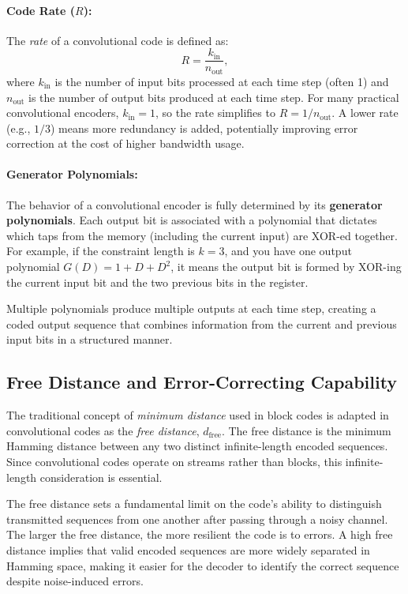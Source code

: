 \documentclass[12pt,a4paper]{article}
\begin{document}
\paragraph{Code Rate ($R$):}  
The \emph{rate} of a convolutional code is defined as:
\[
R = \frac{k_{\text{in}}}{n_{\text{out}}},
\]
where $k_{\text{in}}$ is the number of input bits processed at each time step (often 1) and $n_{\text{out}}$ is the number of output bits produced at each time step. For many practical convolutional encoders, $k_{\text{in}}=1$, so the rate simplifies to $R = 1/n_{\text{out}}$. A lower rate (e.g., $1/3$) means more redundancy is added, potentially improving error correction at the cost of higher bandwidth usage.

\paragraph{Generator Polynomials:}  
The behavior of a convolutional encoder is fully determined by its \textbf{generator polynomials}. Each output bit is associated with a polynomial that dictates which taps from the memory (including the current input) are XOR-ed together. For example, if the constraint length is $k=3$, and you have one output polynomial $G(D) = 1 + D + D^2$, it means the output bit is formed by XOR-ing the current input bit and the two previous bits in the register.

Multiple polynomials produce multiple outputs at each time step, creating a coded output sequence that combines information from the current and previous input bits in a structured manner.

\subsection{Free Distance and Error-Correcting Capability}

The traditional concept of \emph{minimum distance} used in block codes is adapted in convolutional codes as the \emph{free distance}, $d_{\text{free}}$. The free distance is the minimum Hamming distance between any two distinct infinite-length encoded sequences. Since convolutional codes operate on streams rather than blocks, this infinite-length consideration is essential.

The free distance sets a fundamental limit on the code's ability to distinguish transmitted sequences from one another after passing through a noisy channel. The larger the free distance, the more resilient the code is to errors. A high free distance implies that valid encoded sequences are more widely separated in Hamming space, making it easier for the decoder to identify the correct sequence despite noise-induced errors.
\end{document}
